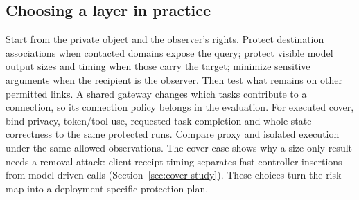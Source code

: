 \subsection{Choosing a layer in practice}
Start from the private object and the observer's rights. Protect destination associations when contacted domains expose the query; protect visible model output sizes and timing when those carry the target; minimize sensitive arguments when the recipient is the observer. Then test what remains on other permitted links. A shared gateway changes which tasks contribute to a connection, so its connection policy belongs in the evaluation. For executed cover, bind privacy, token/tool use, requested-task completion and whole-state correctness to the same protected runs. Compare proxy and isolated execution under the same allowed observations. The cover case shows why a size-only result needs a removal attack: client-receipt timing separates fast controller insertions from model-driven calls (Section~\ref{sec:cover-study}). These choices turn the risk map into a deployment-specific protection plan.
